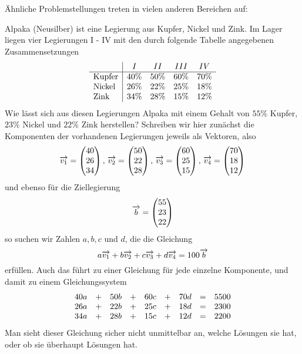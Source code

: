 \"Ahnliche Problemstellungen treten in vielen anderen Bereichen auf:

\begin{beispiel}\label{gls_chemie} Alpaka (Neusilber) ist eine Legierung aus Kupfer, Nickel und Zink. 
Im Lager liegen vier Legierungen I - IV mit den durch folgende Tabelle angegebenen Zusammensetzungen
  $$ \begin{array} {l | c c c c }
  & I & II & III & IV \\
  \hline
  \textrm{Kupfer} & 40\% & 50\% & 60\% & 70\% \\
\textrm{Nickel} & 26\% & 22\% & 25\% & 18\% \\
\textrm{Zink} & 34\% & 28\% & 15\% & 12 \% 
\end{array} $$
Wie lässt sich aus diesen Legierungen Alpaka mit einem Gehalt von $55\%$ Kupfer, $23\%$ Nickel und $22\%$ Zink 
herstellen?
Schreiben wir hier zunächst die Komponenten der vorhandenen Legierungen jeweils als Vektoren, also 
  $$ \overrightarrow{v_1} = \left(\begin{matrix} 40 \\ 26 \\ 34 \end{matrix} \right), \, 
     \overrightarrow{v_2} = \left(\begin{matrix} 50 \\ 22 \\ 28 \end{matrix} \right), \,
     \overrightarrow{v_3} = \left(\begin{matrix} 60 \\ 25 \\ 15 \end{matrix} \right), \,
     \overrightarrow{v_4} = \left(\begin{matrix} 70 \\ 18 \\ 12 \end{matrix} \right)  $$
und ebenso für die Ziellegierung
  $$ \overrightarrow{b} = \left(\begin{matrix} 55 \\ 23 \\22 \end{matrix} \right) $$
so suchen wir Zahlen $a,b,c$ und $d$, die die Gleichung 
  $$ a \overrightarrow{v_1} + b \overrightarrow{v_2} + c \overrightarrow{v_3} + d \overrightarrow{v_4} = 
     100 \overrightarrow{b} $$
erfüllen. Auch das führt zu einer Gleichung für jede einzelne Komponente, und damit zu einem 
Gleichungssystem
  $$ \begin{array} {l c l c l c l c l}
   40 a & + & 50 b & + & 60 c & + & 70 d & = & 5500 \\
   26 a & + & 22 b & + & 25 c & + & 18 d & = & 2300 \\
   34 a & + & 28 b & + & 15 c & + & 12 d & = & 2200 \\
   \end{array} $$
Man sieht dieser Gleichung sicher nicht unmittelbar an, welche Lösungen sie hat, oder ob sie überhaupt 
Lösungen hat.
\end{beispiel}


